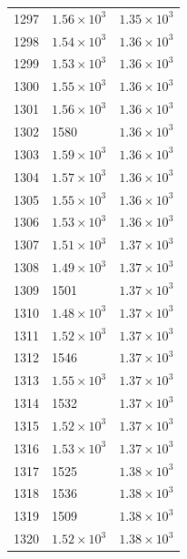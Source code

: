 \begin{table}[H]
\begin{tabular}{lll}
1297 & $\displaystyle 1.56 \times 10^{3}$ & $\displaystyle 1.35 \times 10^{3}$ \\
1298 & $\displaystyle 1.54 \times 10^{3}$ & $\displaystyle 1.36 \times 10^{3}$ \\
1299 & $\displaystyle 1.53 \times 10^{3}$ & $\displaystyle 1.36 \times 10^{3}$ \\
1300 & $\displaystyle 1.55 \times 10^{3}$ & $\displaystyle 1.36 \times 10^{3}$ \\
1301 & $\displaystyle 1.56 \times 10^{3}$ & $\displaystyle 1.36 \times 10^{3}$ \\
1302 & 1580 & $\displaystyle 1.36 \times 10^{3}$ \\
1303 & $\displaystyle 1.59 \times 10^{3}$ & $\displaystyle 1.36 \times 10^{3}$ \\
1304 & $\displaystyle 1.57 \times 10^{3}$ & $\displaystyle 1.36 \times 10^{3}$ \\
1305 & $\displaystyle 1.55 \times 10^{3}$ & $\displaystyle 1.36 \times 10^{3}$ \\
1306 & $\displaystyle 1.53 \times 10^{3}$ & $\displaystyle 1.36 \times 10^{3}$ \\
1307 & $\displaystyle 1.51 \times 10^{3}$ & $\displaystyle 1.37 \times 10^{3}$ \\
1308 & $\displaystyle 1.49 \times 10^{3}$ & $\displaystyle 1.37 \times 10^{3}$ \\
1309 & 1501 & $\displaystyle 1.37 \times 10^{3}$ \\
1310 & $\displaystyle 1.48 \times 10^{3}$ & $\displaystyle 1.37 \times 10^{3}$ \\
1311 & $\displaystyle 1.52 \times 10^{3}$ & $\displaystyle 1.37 \times 10^{3}$ \\
1312 & 1546 & $\displaystyle 1.37 \times 10^{3}$ \\
1313 & $\displaystyle 1.55 \times 10^{3}$ & $\displaystyle 1.37 \times 10^{3}$ \\
1314 & 1532 & $\displaystyle 1.37 \times 10^{3}$ \\
1315 & $\displaystyle 1.52 \times 10^{3}$ & $\displaystyle 1.37 \times 10^{3}$ \\
1316 & $\displaystyle 1.53 \times 10^{3}$ & $\displaystyle 1.37 \times 10^{3}$ \\
1317 & 1525 & $\displaystyle 1.38 \times 10^{3}$ \\
1318 & 1536 & $\displaystyle 1.38 \times 10^{3}$ \\
1319 & 1509 & $\displaystyle 1.38 \times 10^{3}$ \\
1320 & $\displaystyle 1.52 \times 10^{3}$ & $\displaystyle 1.38 \times 10^{3}$ \\

\end{tabular}
\end{table}
